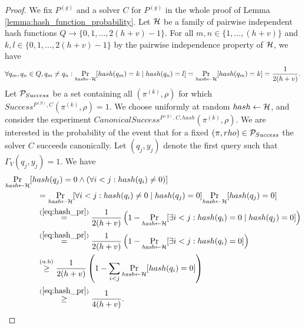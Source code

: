 \begin{proof}
We fix $P^{(g)}$ and a solver $C$ for $P^{(g)}$ in the whole proof of Lemma \ref{lemma:hash_function_probability}.
Let $\mathcal{H}$ be a family of pairwise independent hash functions $Q \rightarrow \{0,1, \dots,2(h+v)-1\}$.
For all $m,n \in \{1, \dots, (h+v)\}$ and $k,l \in \{0,1,\dots,2(h+v)-1\}$ by the pairwise independence property of $\mathcal{H}$, we have
\begin{align}
  \label{eq:hash_pr}
 \forall q_m,q_n \in Q, q_m \neq q_n : \underset{\textit{hash} \leftarrow \mathcal{H}}{\Pr}[hash(q_m) = k \mid hash(q_n) = l] = \underset{\textit{hash} \leftarrow \mathcal{H}}{\Pr}[hash(q_m) = k] = \frac{1}{2(h+v)}.
\end{align}
%
Let $\mathcal{P}_{Success}$ be a set containing all $(\pi^{(k)},\rho)$ for which $Success^{P^{(g)}, C}(\pi^{(k)}, \rho) = 1$.
We choose uniformly at random $hash \leftarrow \mathcal{H}$, and consider the experiment $CanonicalSuccess^{P^{(g)}, C, hash}(\pi^{(k)}, \rho)$.
We are interested in the probability of the event that for a fixed $(\pi, rho) \in \mathcal{P}_{Success}$ the solver $C$ succeeds canonically.
Let $(q_j, y_j)$ denote the first query such that $\Gamma_V(q_j, y_j) = 1$.
We have
\begin{align*}
  &\underset{\textit{hash} \leftarrow \mathcal{H}}{\Pr}[hash(q_j) = 0 \land (\forall i < j : hash(q_i) \neq 0)]\\
  &\mbox\qquad\qquad = \underset{\textit{hash} \leftarrow \mathcal{H}}{\Pr}[\forall i < j : hash(q_i) \neq 0 \mid hash(q_j) = 0] \underset{\textit{hash} \leftarrow \mathcal{H}}{\Pr}[hash(q_j) = 0] \\
  &\mbox\qquad\qquad \stackrel{(\ref{eq:hash_pr})}{=} \frac{1}{2(h+v)}\left(1 -\underset{\textit{hash} \leftarrow \mathcal{H}}{\Pr}[\exists i < j : hash(q_i) = 0 \mid hash(q_j) = 0] \right) \\
  &\mbox\qquad\qquad \stackrel{(\ref{eq:hash_pr})}{=} \frac{1}{2(h+v)} \left( 1 -\underset{\textit{hash} \leftarrow \mathcal{H}}{\Pr}[\exists i < j : hash(q_i) = 0] \right) \\
  &\mbox\qquad\qquad \stackrel{(\text{u.b})}{\geq} \frac{1}{2(h+v)} \left( 1 - \sum_{i < j} \underset{\textit{hash} \leftarrow \mathcal{H}}{\Pr}[hash(q_i) = 0] \right) \\
  &\mbox\qquad\qquad \stackrel{(\ref{eq:hash_pr})}{\geq} \frac{1}{4(h+v)}.
\end{align*}


\end{proof}
